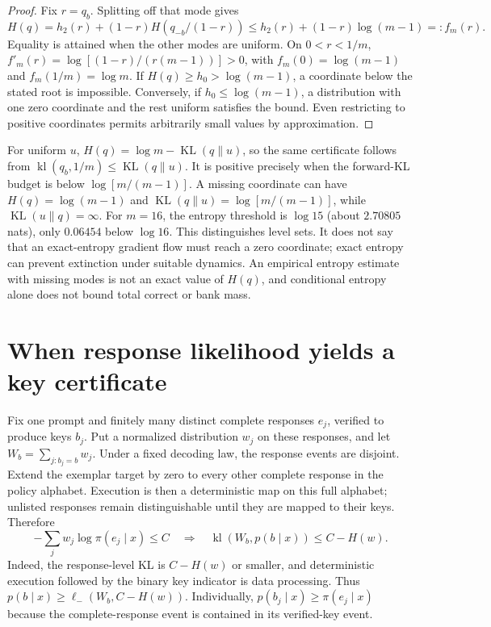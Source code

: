 \documentclass[11pt]{article}
\DeclareMathOperator{\KL}{KL}
\DeclareMathOperator{\kl}{kl}
\begin{document}
\begin{proof}
Fix $r=q_b$. Splitting off that mode gives
\[
 H(q)=h_2(r)+(1-r)H(q_{-b}/(1-r))
 \le h_2(r)+(1-r)\log(m-1)=:f_m(r).
\]
Equality is attained when the other modes are uniform. On $0<r<1/m$,
$f'_m(r)=\log[(1-r)/(r(m-1))]>0$, with
$f_m(0)=\log(m-1)$ and $f_m(1/m)=\log m$.
If $H(q)\ge h_0>\log(m-1)$, a coordinate below the stated root is
impossible. Conversely, if $h_0\le\log(m-1)$, a distribution with one
zero coordinate and the rest uniform satisfies the bound. Even restricting
to positive coordinates permits arbitrarily small values by approximation.
\end{proof}

For uniform $u$, $H(q)=\log m-\KL(q\|u)$, so the same certificate follows
from $\kl(q_b,1/m)\le\KL(q\|u)$. It is positive precisely when the
forward-KL budget is below $\log[m/(m-1)]$. A missing coordinate can have
$H(q)=\log(m-1)$ and $\KL(q\|u)=\log[m/(m-1)]$, while
$\KL(u\|q)=\infty$. For $m=16$, the entropy threshold is $\log15$
(about $2.70805$ nats), only $0.06454$ below $\log16$.
This distinguishes level sets. It does not say that an exact-entropy gradient
flow must reach a zero coordinate; exact entropy can prevent extinction
under suitable dynamics. An empirical entropy estimate with missing modes
is not an exact value of $H(q)$, and conditional entropy alone does not
bound total correct or bank mass.

\section{When response likelihood yields a key certificate}
Fix one prompt and finitely many distinct complete responses $e_j$, verified
to produce keys $b_j$. Put a normalized distribution $w_j$ on these responses,
and let $W_b=\sum_{j:b_j=b}w_j$. Under a fixed decoding law, the response
events are disjoint. Extend the exemplar target by zero to every other
complete response in the policy alphabet. Execution is then a deterministic
map on this full alphabet; unlisted responses remain distinguishable until
they are mapped to their keys. Therefore
\[
 -\sum_jw_j\log\pi(e_j\mid x)\le C
 \quad\Longrightarrow\quad
 \kl(W_b,p(b\mid x))\le C-H(w).
\]
Indeed, the response-level KL is $C-H(w)$ or smaller, and deterministic
execution followed by the binary key indicator is data processing.
Thus $p(b\mid x)\ge\ell_-(W_b,C-H(w))$. Individually,
$p(b_j\mid x)\ge\pi(e_j\mid x)$ because the complete-response event is
contained in its verified-key event.
\end{document}
